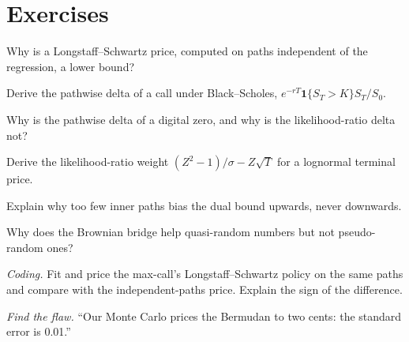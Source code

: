 \section{Exercises}

\begin{exercise}[$\star$]\label{exo:dv:monte-carlo-pricers-in-practice:1}
Why is a Longstaff--Schwartz price, computed on paths independent of the regression, a lower bound?
\end{exercise}

\begin{exercise}[$\star$]\label{exo:dv:monte-carlo-pricers-in-practice:2}
Derive the pathwise delta of a call under Black--Scholes, $e^{-rT}\mathbf 1\{S_T>K\}S_T/S_0$.
\end{exercise}

\begin{exercise}[$\star$]\label{exo:dv:monte-carlo-pricers-in-practice:3}
Why is the pathwise delta of a digital zero, and why is the likelihood-ratio delta not?
\end{exercise}

\begin{exercise}[$\star\star$]\label{exo:dv:monte-carlo-pricers-in-practice:4}
Derive the likelihood-ratio  weight $(Z^2-1)/\sigma-Z\sqrt T$ for a lognormal terminal price.
\end{exercise}

\begin{exercise}[$\star\star$]\label{exo:dv:monte-carlo-pricers-in-practice:5}
Explain why too few inner paths bias the dual bound upwards, never downwards.
\end{exercise}

\begin{exercise}[$\star\star$]\label{exo:dv:monte-carlo-pricers-in-practice:6}
Why does the Brownian bridge help quasi-random numbers but not pseudo-random ones?
\end{exercise}

\begin{exercise}[$\star\star\star$]\label{exo:dv:monte-carlo-pricers-in-practice:7}
\emph{Coding.} Fit and price the max-call's Longstaff--Schwartz policy on the same paths and compare with the independent-paths price. Explain the sign of the
difference.
\end{exercise}

\begin{exercise}[$\star\star\star$]\label{exo:dv:monte-carlo-pricers-in-practice:8}
\emph{Find the flaw.} ``Our Monte Carlo prices the Bermudan to two cents: the standard error is 0.01.''
\end{exercise}

